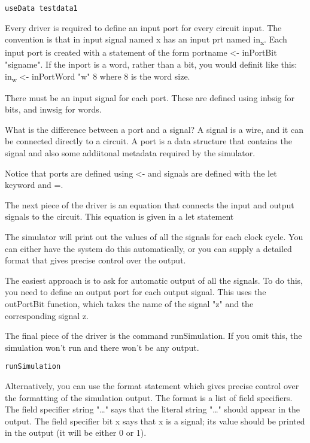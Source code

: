 \documentclass[11pt]{article}
\begin{document}
\begin{verbatim}
useData testdata1
\end{verbatim}

Every driver is required to define an input port for every circuit
input.  The convention is that in input signal named x has an input
prt named in\textsubscript{x}.  Each input port is created with a statement of the
form portname <- inPortBit "signame".  If the inport is a word, rather
than a bit, you would definit like this: in\textsubscript{w} <- inPortWord "w" 8
where 8 is the word size.

There must be an input signal for each port.  These are defined using
inbsig for bits, and inwsig for words.

What is the difference between a port and a signal?  A signal is a
wire, and it can be connected directly to a circuit.  A port is a data
structure that contains the signal and also some addiitonal metadata
required by the simulator.

Notice that ports are defined using <- and signals are defined with
the let keyword and =.

The next piece of the driver is an equation that connects the input
and output signals to the circuit.  This equation is given in a let
statement

The simulator will print out the values of all the signals for each
clock cycle.  You can either have the system do this automatically, or
you can supply a detailed format that gives precise control over the
output.

The easiest approach is to ask for automatic output of all the
signals.  To do this, you need to define an output port for each
output signal.  This uses the outPortBit function, which takes the
name of the signal "z" and the corresponding signal z.

The final piece of the driver is the command runSimulation.  If you
omit this, the simulation won't run and there won't be any output.

\begin{verbatim}
runSimulation
\end{verbatim}

Alternatively, you can use the format statement which gives precise
control over the formatting of the simulation output.  The format is a
list of field specifiers.  The field specifier string "\ldots{}" says that
the literal string "\ldots{}" should appear in the output.  The field
specifier bit x says that x is a signal; its value should be printed
in the output (it will be either 0 or 1).
\end{document}
